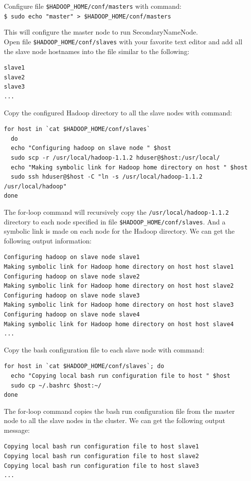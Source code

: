 Configure file \verb|$HADOOP_HOME/conf/masters| with command: \\
\verb|$ sudo echo "master" > $HADOOP_HOME/conf/masters|

This will configure the master node to run SecondaryNameNode. \\
Open file \verb|$HADOOP_HOME/conf/slaves| with your favorite text editor and add all the slave node hostnames into the file similar to the following:
\begin{verbatim}
slave1
slave2
slave3
...
\end{verbatim}

Copy the configured Hadoop directory to all the slave nodes with command:
\begin{verbatim}
for host in `cat $HADOOP_HOME/conf/slaves`
  do
  echo "Configuring hadoop on slave node " $host
  sudo scp -r /usr/local/hadoop-1.1.2 hduser@$host:/usr/local/
  echo "Making symbolic link for Hadoop home directory on host " $host
  sudo ssh hduser@$host -C "ln -s /usr/local/hadoop-1.1.2 /usr/local/hadoop"
done
\end{verbatim}

The for-loop command will recursively copy the \verb|/usr/local/hadoop-1.1.2| directory to each node specified in file \verb|$HADOOP_HOME/conf/slaves|. And a symbolic link is made on each node for the Hadoop directory. We can get the following output information:
\begin{verbatim}
Configuring hadoop on slave node slave1
Making symbolic link for Hadoop home directory on host host slave1
Configuring hadoop on slave node slave2
Making symbolic link for Hadoop home directory on host host slave2
Configuring hadoop on slave node slave3
Making symbolic link for Hadoop home directory on host host slave3
Configuring hadoop on slave node slave4
Making symbolic link for Hadoop home directory on host host slave4
...
\end{verbatim}

Copy the bash configuration file to each slave node with command:
\begin{verbatim}
for host in `cat $HADOOP_HOME/conf/slaves`; do
  echo "Copying local bash run configuration file to host " $host
  sudo cp ~/.bashrc $host:~/
done
\end{verbatim}

The for-loop command copies the bash run configuration file from the master node to all the slave nodes in the cluster. We can get the following output message:
\begin{verbatim}
Copying local bash run configuration file to host slave1
Copying local bash run configuration file to host slave2
Copying local bash run configuration file to host slave3
...
\end{verbatim}

